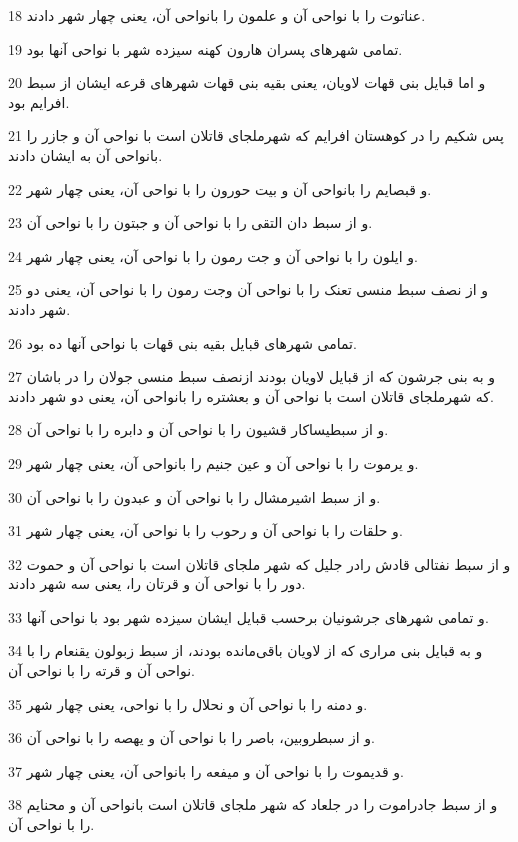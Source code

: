 \par 18 عناتوت را با نواحی آن و علمون را بانواحی آن، یعنی چهار شهر دادند.
\par 19 تمامی شهرهای پسران هارون کهنه سیزده شهر با نواحی آنها بود.
\par 20 و اما قبایل بنی قهات لاویان، یعنی بقیه بنی قهات شهرهای قرعه ایشان از سبط افرایم بود.
\par 21 پس شکیم را در کوهستان افرایم که شهرملجای قاتلان است با نواحی آن و جازر را بانواحی آن به ایشان دادند.
\par 22 و قبصایم را بانواحی آن و بیت حورون را با نواحی آن، یعنی چهار شهر.
\par 23 و از سبط دان التقی را با نواحی آن و جبتون را با نواحی آن.
\par 24 و ایلون را با نواحی آن و جت رمون را با نواحی آن، یعنی چهار شهر.
\par 25 و از نصف سبط منسی تعنک را با نواحی آن وجت رمون را با نواحی آن، یعنی دو شهر دادند.
\par 26 تمامی شهرهای قبایل بقیه بنی قهات با نواحی آنها ده بود.
\par 27 و به بنی جرشون که از قبایل لاویان بودند ازنصف سبط منسی جولان را در باشان که شهرملجای قاتلان است با نواحی آن و بعشتره را بانواحی آن، یعنی دو شهر دادند.
\par 28 و از سبطیساکار قشیون را با نواحی آن و دابره را با نواحی آن.
\par 29 و یرموت را با نواحی آن و عین جنیم را بانواحی آن، یعنی چهار شهر.
\par 30 و از سبط اشیرمشال را با نواحی آن و عبدون را با نواحی آن.
\par 31 و حلقات را با نواحی آن و رحوب را با نواحی آن، یعنی چهار شهر.
\par 32 و از سبط نفتالی قادش رادر جلیل که شهر ملجای قاتلان است با نواحی آن و حموت دور را با نواحی آن و قرتان را، یعنی سه شهر دادند.
\par 33 و تمامی شهرهای جرشونیان برحسب قبایل ایشان سیزده شهر بود با نواحی آنها.
\par 34 و به قبایل بنی مراری که از لاویان باقی‌مانده بودند، از سبط زبولون یقنعام را با نواحی آن و قرته را با نواحی آن.
\par 35 و دمنه را با نواحی آن و نحلال را با نواحی، یعنی چهار شهر.
\par 36 و از سبطروبین، باصر را با نواحی آن و یهصه را با نواحی آن.
\par 37 و قدیموت را با نواحی آن و میفعه را بانواحی آن، یعنی چهار شهر.
\par 38 و از سبط جادراموت را در جلعاد که شهر ملجای قاتلان است بانواحی آن و محنایم را با نواحی آن.
